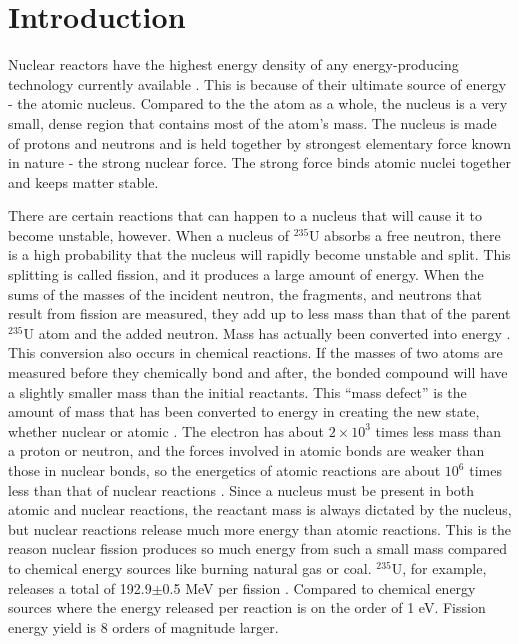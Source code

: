 \chapter{Introduction}

Nuclear reactors have the highest energy density of any energy-producing technology currently available \cite{energy_density}.  This is because of their ultimate source of energy - the atomic nucleus.  Compared to the the atom as a whole, the nucleus is a very small, dense region that contains most of the atom's mass.  The nucleus is made of protons and neutrons and is held together by strongest elementary force known in nature - the strong nuclear force. The strong force binds atomic nuclei together and keeps matter stable.  

There are certain reactions that can happen to a nucleus that will cause it to become unstable, however.  When a nucleus of $^{235}$U absorbs a free neutron, there is a high probability that the nucleus will rapidly become unstable and split.  This splitting is called fission, and it produces a large amount of energy.  When the sums of the masses of the incident neutron, the fragments, and neutrons that result from fission are measured, they add up to less mass than that of the parent $^{235}$U atom and the added neutron.  Mass has actually been converted into energy \cite{krane, duderstadt}.  This conversion also occurs in chemical reactions.  If the masses of two atoms are measured before they chemically bond and after, the bonded compound will have a slightly smaller mass than the initial reactants.  This ``mass defect'' is the amount of mass that has been converted to energy in creating the new state, whether nuclear or atomic \cite{mass_energy}.  The electron has about $2\times10^3$ times less mass than a proton or neutron, and the forces involved in atomic bonds are weaker than those in nuclear bonds, so the energetics of atomic reactions are about $10^6$ times less than that of nuclear reactions \cite{krane}.  Since a nucleus must be present in both atomic and nuclear reactions, the reactant mass is always dictated by the nucleus, but nuclear reactions release much more energy than atomic reactions.  This is the reason nuclear fission produces so much energy from such a small mass compared to chemical energy sources like burning natural gas or coal.   $^{235}$U, for example, releases a total of 192.9$\pm$0.5 MeV per fission \cite{duderstadt}.  Compared to chemical energy sources where the energy released per reaction is on the order of 1 eV.  Fission energy yield is 8 orders of magnitude larger.

